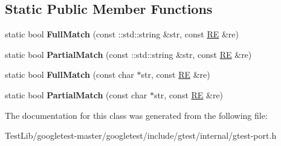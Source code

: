 \subsection*{Static Public Member Functions}
\begin{DoxyCompactItemize}
\item 
\mbox{\label{classtesting_1_1internal_1_1RE_aa79a950758d0f1d62f7762d1e9cefe86}} 
static bool {\bfseries Full\+Match} (const \+::std\+::string \&str, const \hyperlink{classtesting_1_1internal_1_1RE}{RE} \&re)
\item 
\mbox{\label{classtesting_1_1internal_1_1RE_a1e81f9a87211bdca645e025f8f0236c8}} 
static bool {\bfseries Partial\+Match} (const \+::std\+::string \&str, const \hyperlink{classtesting_1_1internal_1_1RE}{RE} \&re)
\item 
\mbox{\label{classtesting_1_1internal_1_1RE_a2b13ec1f6ccd6c32f7efa01e21588f0b}} 
static bool {\bfseries Full\+Match} (const char $\ast$str, const \hyperlink{classtesting_1_1internal_1_1RE}{RE} \&re)
\item 
\mbox{\label{classtesting_1_1internal_1_1RE_a97495dd4c2bb9589522823f060c8e8ba}} 
static bool {\bfseries Partial\+Match} (const char $\ast$str, const \hyperlink{classtesting_1_1internal_1_1RE}{RE} \&re)
\end{DoxyCompactItemize}


The documentation for this class was generated from the following file\+:\begin{DoxyCompactItemize}
\item 
Test\+Lib/googletest-\/master/googletest/include/gtest/internal/gtest-\/port.\+h\end{DoxyCompactItemize}
